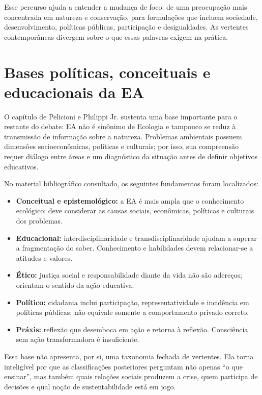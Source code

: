 \documentclass[12pt,a4paper]{article}
\begin{document}
Esse percurso ajuda a entender a mudança de foco: de uma preocupação mais concentrada em natureza e conservação, para formulações que incluem sociedade, desenvolvimento, políticas públicas, participação e desigualdades. As vertentes contemporâneas divergem sobre o que essas palavras exigem na prática.

\section{Bases políticas, conceituais e educacionais da EA}

O capítulo de Pelicioni e Philippi Jr. sustenta uma base importante para o restante do debate: EA não é sinônimo de Ecologia e tampouco se reduz à transmissão de informação sobre a natureza. Problemas ambientais possuem dimensões socioeconômicas, políticas e culturais; por isso, sua compreensão requer diálogo entre áreas e um diagnóstico da situação antes de definir objetivos educativos.

No material bibliográfico consultado, os seguintes fundamentos foram localizados:

\begin{itemize}
  \item \textbf{Conceitual e epistemológico:} a EA é mais ampla que o conhecimento ecológico; deve considerar as causas sociais, econômicas, políticas e culturais dos problemas.
  \item \textbf{Educacional:} interdisciplinaridade e transdisciplinaridade ajudam a superar a fragmentação do saber. Conhecimento e habilidades devem relacionar-se a atitudes e valores.
  \item \textbf{Ético:} justiça social e responsabilidade diante da vida não são adereços; orientam o sentido da ação educativa.
  \item \textbf{Político:} cidadania inclui participação, representatividade e incidência em políticas públicas; não equivale somente a comportamento privado correto.
  \item \textbf{Práxis:} reflexão que desemboca em ação e retorna à reflexão. Consciência sem ação transformadora é insuficiente.
\end{itemize}

Essa base não apresenta, por si, uma taxonomia fechada de vertentes. Ela torna inteligível por que as classificações posteriores perguntam não apenas ``o que ensinar'', mas também quais relações sociais produzem a crise, quem participa de decisões e qual noção de sustentabilidade está em jogo.
\end{document}
